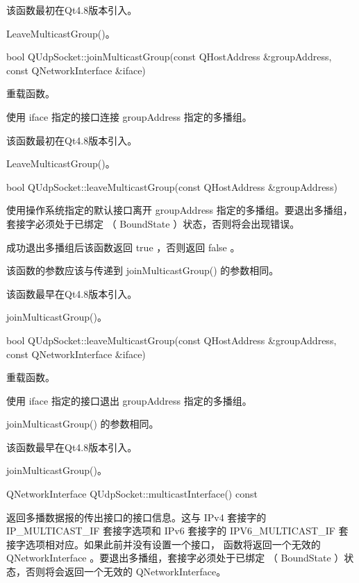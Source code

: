 该函数最初在Qt4.8版本引入。

\begin{seeAlso}
LeaveMulticastGroup()。
\end{seeAlso}

bool QUdpSocket::joinMulticastGroup(const QHostAddress \&groupAddress, const QNetworkInterface \&iface)

重载函数。

使用 iface 指定的接口连接 groupAddress 指定的多播组。

该函数最初在Qt4.8版本引入。

\begin{seeAlso}
LeaveMulticastGroup()。
\end{seeAlso}

bool QUdpSocket::leaveMulticastGroup(const QHostAddress \&groupAddress)

使用操作系统指定的默认接口离开 groupAddress 指定的多播组。要退出多播组，套接字必须处于已绑定 （ BoundState ）状态，否则将会出现错误。

成功退出多播组后该函数返回 true ，否则返回 false 。

\begin{notice}
该函数的参数应该与传递到 joinMulticastGroup() 的参数相同。
\end{notice}

该函数最早在Qt4.8版本引入。

\begin{seeAlso}
joinMulticastGroup()。
\end{seeAlso}

bool QUdpSocket::leaveMulticastGroup(const QHostAddress \&groupAddress, const QNetworkInterface \&iface)

重载函数。

使用 iface 指定的接口退出 groupAddress 指定的多播组。

\begin{notice}
joinMulticastGroup() 的参数相同。
\end{notice}

该函数最早在Qt4.8版本引入。

\begin{seeAlso}
joinMulticastGroup()。
\end{seeAlso}

QNetworkInterface QUdpSocket::multicastInterface() const

返回多播数据报的传出接口的接口信息。这与 IPv4 套接字的 IP\_MULTICAST\_IF 套接字选项和 IPv6 套接字的 IPV6\_MULTICAST\_IF 套接字选项相对应。如果此前并没有设置一个接口， 函数将返回一个无效的 QNetworkInterface 。要退出多播组，套接字必须处于已绑定 （ BoundState ）状态，否则将会返回一个无效的 QNetworkInterface。

